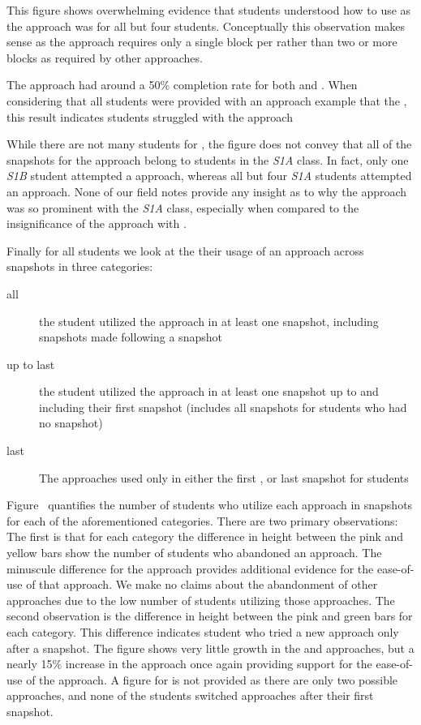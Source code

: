 This figure shows overwhelming evidence that students understood how to use
\glideto{} as the approach was \com{} for all but four students. Conceptually
this observation makes sense as the approach requires only a single block per
\catch{} rather than two or more blocks as required by other approaches.

The \abs{} approach had around a 50\% completion rate for both \sone{} and
\stwo{}. When considering that all students were provided with an \abs{}
approach example that  the \zebra{}, this result indicates students
struggled with the \abs{} approach

While there are not many students for \sone{}, the figure does not convey that
all of the \com{} snapshots for the \rel{} approach belong to students in the
\emph{S1A} class. In fact, only one \emph{S1B} student attempted a \rel{}
approach, whereas all but four \emph{S1A} students attempted an \abs{}
approach. None of our field notes provide any insight as to why the \rel{}
approach was so prominent with the \emph{S1A} class, especially when compared
to the insignificance of the \rel{} approach with \stwo{}.

Finally for all students we look at the their usage of an approach across
snapshots in three categories:

\begin{description}
\item[all] the student utilized the approach in at least one snapshot,
  including snapshots made following a \com{} snapshot
\item[up to last] the student utilized the approach in at least one snapshot up
  to and including their first \com{} snapshot (includes all snapshots for
  students who had no \com{} snapshot)
\item[last] The approaches used only in either the first \com{}, or last
  snapshot for \incom{} students
\end{description}

Figure~ quantifies the number of students who
utilize each approach in \stwo{} snapshots for each of the aforementioned
categories. There are two primary observations: The first is that for each
category the difference in height between the pink and yellow bars show the
number of students who abandoned an approach. The minuscule difference for the
\glideto{} approach provides additional evidence for the ease-of-use of that
approach. We make no claims about the abandonment of other approaches due to
the low number of students utilizing those approaches. The second observation
is the difference in height between the pink and green bars for each
category. This difference indicates student who tried a new approach only after
a \com{} snapshot. The figure shows very little growth in the \abs{} and \rel{}
approaches, but a nearly 15\% increase in the \glideto{} approach once again
providing support for the ease-of-use of the \glideto{} approach. A figure for
\sone{} is not provided as there are only two possible approaches, and none of
the students switched approaches after their first \com{} snapshot.

